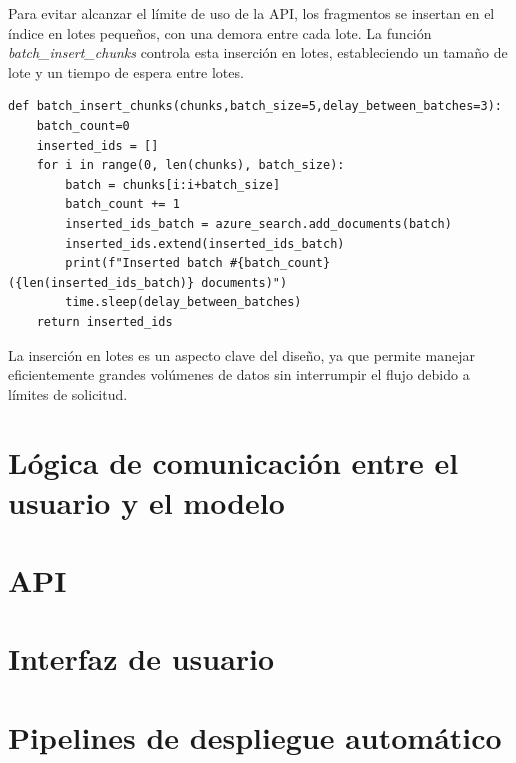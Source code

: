 Para evitar alcanzar el límite de uso de la API, los fragmentos se insertan en el índice en lotes pequeños, con una demora entre cada lote. 
La función \textit{batch\_insert\_chunks} controla esta inserción en lotes, estableciendo un tamaño de lote y un tiempo de espera entre lotes.

\begin{lstlisting}[label=cod:update-db-6,caption=Inserción en lotes.]
	def batch_insert_chunks(chunks,batch_size=5,delay_between_batches=3):
    batch_count=0
    inserted_ids = []
    for i in range(0, len(chunks), batch_size):
        batch = chunks[i:i+batch_size]
        batch_count += 1
        inserted_ids_batch = azure_search.add_documents(batch)
        inserted_ids.extend(inserted_ids_batch)
        print(f"Inserted batch #{batch_count} ({len(inserted_ids_batch)} documents)")
        time.sleep(delay_between_batches)
    return inserted_ids
\end{lstlisting}

La inserción en lotes es un aspecto clave del diseño, ya que permite manejar eficientemente grandes volúmenes de datos sin interrumpir
 el flujo debido a límites de solicitud.

\section{Lógica de comunicación entre el usuario y el modelo}

\section{API}

\section{Interfaz de usuario}

\section{Pipelines de despliegue automático}